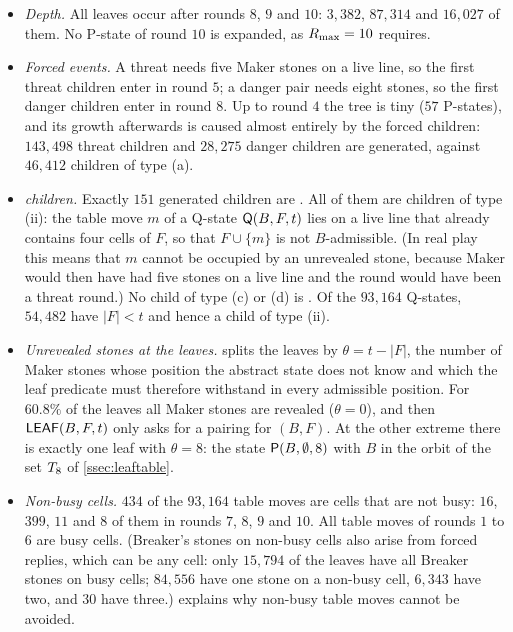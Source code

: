 \begin{itemize}[leftmargin=1.6em]
\item \emph{Depth.} All leaves occur after rounds $8$, $9$ and $10$: $3{,}382$, $87{,}314$ and $16{,}027$
  of them. No P-state of round $10$ is expanded, as $R_{\max}=10$ requires.
\item \emph{Forced events.} A threat needs five Maker stones on a live line, so the first threat children
  enter in round $5$; a danger pair needs eight stones, so the first danger children enter in round $8$.
  Up to round $4$ the tree is tiny ($57$ P-states), and its growth afterwards is caused almost entirely by
  the forced children: $143{,}498$ threat children and $28{,}275$ danger children are generated, against
  $46{,}412$ children of type (a).
\item \emph{\VOID{} children.} Exactly $151$ generated children are \VOID. All of them are children of type
  (ii): the table move $m$ of a Q-state $\mathsf{Q}(B,F,t)$ lies on a live line that already contains four
  cells of $F$, so that $F\cup\{m\}$ is not $B$-admissible. (In real play this means that $m$ cannot be
  occupied by an unrevealed stone, because Maker would then have had five stones on a live line and the
  round would have been a threat round.) No child of type (c) or (d) is \VOID. Of the $93{,}164$ Q-states,
  $54{,}482$ have $|F|<t$ and hence a child of type (ii).
\item \emph{Unrevealed stones at the leaves.}  splits the leaves by
  $\theta=t-|F|$, the number of Maker stones whose position the abstract state does not know and which the
  leaf predicate must therefore withstand in every admissible position. For $60.8\%$ of the leaves
  all Maker stones are revealed ($\theta=0$), and then $\mathsf{LEAF}(B,F,t)$ only asks for a pairing for $(B,F)$.
  At the other extreme there is exactly one leaf with $\theta=8$: the state $\mathsf{P}(B,\emptyset,8)$ with $B$
  in the orbit of the set $T_8$ of \cref{ssec:leaftable}.
\item \emph{Non-busy cells.} $434$ of the $93{,}164$ table moves are cells that are not busy: $16$, $399$,
  $11$ and $8$ of them in rounds $7$, $8$, $9$ and $10$. All table moves of rounds $1$ to $6$ are busy
  cells. (Breaker's stones on non-busy cells also arise from forced replies, which can be any cell: only
  $15{,}794$ of the leaves have all Breaker stones on busy cells; $84{,}556$ have one stone on a non-busy
  cell, $6{,}343$ have two, and $30$ have three.)  explains why non-busy table moves
  cannot be avoided.
\end{itemize}

